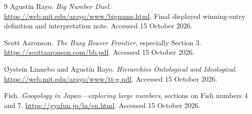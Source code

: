 \documentclass[11pt]{article}
\begin{document}
\begin{thebibliography}{9}
Agust\'in Rayo.
\emph{Big Number Duel}.
\url{https://web.mit.edu/arayo/www/bignums.html}.
Final displayed winning-entry definition and interpretation note.
Accessed 15 October 2026.

Scott Aaronson.
\emph{The Busy Beaver Frontier}, especially Section 3.
\url{https://scottaaronson.com/bb.pdf}.
Accessed 15 October 2026.

\O ystein Linnebo and Agust\'in Rayo.
\emph{Hierarchies Ontological and Ideological}.
\url{https://web.mit.edu/arayo/www/tt-g.pdf}.
Accessed 15 October 2026.

Fish.
\emph{Googology in Japan---exploring large numbers},
sections on Fish numbers 4 and 7.
\url{https://gyafun.jp/ln/en.html}.
Accessed 15 October 2026.
\end{thebibliography}
\end{document}
